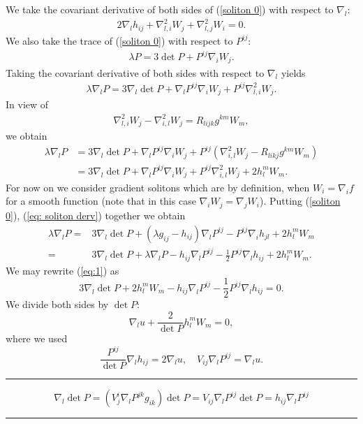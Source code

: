 \documentclass{amsart}
\theoremstyle{definition}
\theoremstyle{remark}
\numberwithin{equation}{section}
\newenvironment{note}{\hrule}{\hrule}
\begin{document}
We take the covariant derivative of both sides of (\ref{soliton 0}) with respect to $\nabla_l:$
\begin{align}\label{eq: soliton derv}
2\nabla_lh_{ij}+\nabla^2_{l,i}W_j+\nabla^2_{l,j}W_i=0.
\end{align}
We also take the trace of (\ref{soliton 0}) with respect to $P^{ij}$:
\begin{align}\label{trace}
\lambda P=3\det P+P^{ij}\nabla_iW_j.
\end{align}
Taking the covariant derivative of both sides with respect to $\nabla_l$ yields
\begin{align*}
\lambda \nabla_l P=3\nabla_l\det P+\nabla_l P^{ij}\nabla_iW_j+P^{ij}\nabla^2_{l,i}W_j.
\end{align*}
In view of
\begin{align*}
\nabla^2_{l,i}W_j-\nabla^2_{i,l}W_j=R_{lijk} g^{km}W_m,
\end{align*}
we obtain
\begin{align}\label{equ00}
\lambda \nabla_l P&=3\nabla_l\det P+\nabla_l P^{ij}\nabla_iW_j+P^{ij}(\nabla^2_{i,l}W_j -R_{likj}g^{km}W_m)\\
&=3\nabla_l\det P+\nabla_l P^{ij}\nabla_iW_j+P^{ij}\nabla^2_{i,l}W_j+2h_l^mW_m.\nonumber
\end{align}
For now on  we consider gradient solitons which are by definition, when $W_i=\nabla_if$ for a smooth function (note that in this case $\nabla_iW_j=\nabla_jW_i$).
Putting (\ref{soliton 0}), (\ref{eq: soliton derv}) together we obtain
\begin{align}\label{eq:1}
\lambda \nabla_l P
=&3\nabla_l\det P+(\lambda g_{ij}-h_{ij})\nabla_l P^{ij}-P^{ij}\nabla_ih_{jl}+2h_l^mW_m\\
=&3\nabla_l\det P+\lambda \nabla_l P-h_{ij}\nabla_l P^{ij}-\frac{1}{2}P^{ij}\nabla_lh_{ij}+2h_l^mW_m.\nonumber
\end{align}
We may rewrite (\ref{eq:1}) as
\[3\nabla_l\det P+2h_l^mW_m-h_{ij}\nabla_l P^{ij}-\frac{1}{2}P^{ij}\nabla_lh_{ij}=0.\]
We divide both sides by $\det P:$
\begin{equation}\label{eq:a}
\nabla_lu+\frac{2}{\det P}h_l^mW_m=0,
\end{equation}
where we used
\begin{equation}\label{eq0}
\frac{P^{ij}}{\det P}\nabla_lh_{ij}=2\nabla_lu,\quad V_{ij}\nabla_lP^{ij}=\nabla_lu.
\end{equation}

\begin{note}
\[
\nabla_l \det P = (V^i_j \nabla_l P^{jk} g_{ik}) \det P = V_{ij} \nabla_l P^{ij} \det P = h_{ij} \nabla_l P^{ij}
\]
\end{note}
\end{document}
